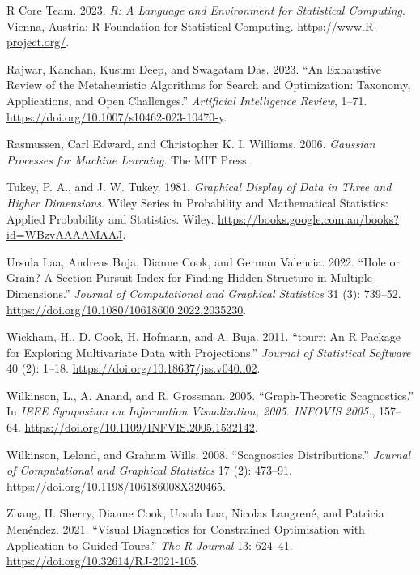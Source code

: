 \documentclass[
  12pt,
]{interact}
\newlength{\cslhangindent}
\newenvironment{CSLReferences}[2] %
 {\begin{list}{}{%
  \setlength{\itemindent}{0pt}
  \setlength{\leftmargin}{0pt}
  \setlength{\parsep}{0pt}
  \ifodd #1
   \setlength{\leftmargin}{\cslhangindent}
   \setlength{\itemindent}{-1\cslhangindent}
  \fi
  \setlength{\itemsep}{#2\baselineskip}}}
 {\end{list}}
\theoremstyle{plain}
\begin{document}
\begin{CSLReferences}{1}{0}
R Core Team. 2023. \emph{R: A Language and Environment for Statistical
Computing}. Vienna, Austria: R Foundation for Statistical Computing.
\url{https://www.R-project.org/}.

Rajwar, Kanchan, Kusum Deep, and Swagatam Das. 2023. {``An Exhaustive
Review of the Metaheuristic Algorithms for Search and Optimization:
Taxonomy, Applications, and Open Challenges.''} \emph{Artificial
Intelligence Review}, 1--71.
\url{https://doi.org/10.1007/s10462-023-10470-y}.

Rasmussen, Carl Edward, and Christopher K. I. Williams. 2006.
\emph{Gaussian Processes for Machine Learning}. The MIT Press.

Tukey, P. A., and J. W. Tukey. 1981. \emph{Graphical Display of Data in
Three and Higher Dimensions}. Wiley Series in Probability and
Mathematical Statistics: Applied Probability and Statistics. Wiley.
\url{https://books.google.com.au/books?id=WBzvAAAAMAAJ}.

Ursula Laa, Andreas Buja, Dianne Cook, and German Valencia. 2022.
{``Hole or Grain? A Section Pursuit Index for Finding Hidden Structure
in Multiple Dimensions.''} \emph{Journal of Computational and Graphical
Statistics} 31 (3): 739--52.
\url{https://doi.org/10.1080/10618600.2022.2035230}.

Wickham, H., D. Cook, H. Hofmann, and A. Buja. 2011. {``{tourr}: An {R}
Package for Exploring Multivariate Data with Projections.''}
\emph{Journal of Statistical Software} 40 (2): 1--18.
\url{https://doi.org/10.18637/jss.v040.i02}.

Wilkinson, L., A. Anand, and R. Grossman. 2005. {``Graph-Theoretic
Scagnostics.''} In \emph{IEEE Symposium on Information Visualization,
2005. INFOVIS 2005.}, 157--64.
\url{https://doi.org/10.1109/INFVIS.2005.1532142}.

Wilkinson, Leland, and Graham Wills. 2008. {``Scagnostics
Distributions.''} \emph{Journal of Computational and Graphical
Statistics} 17 (2): 473--91.
\url{https://doi.org/10.1198/106186008X320465}.

Zhang, H. Sherry, Dianne Cook, Ursula Laa, Nicolas Langrené, and
Patricia Menéndez. 2021. {``Visual Diagnostics for Constrained
Optimisation with Application to Guided Tours.''} \emph{The R Journal}
13: 624--41. \url{https://doi.org/10.32614/RJ-2021-105}.

\end{CSLReferences}
\end{document}
